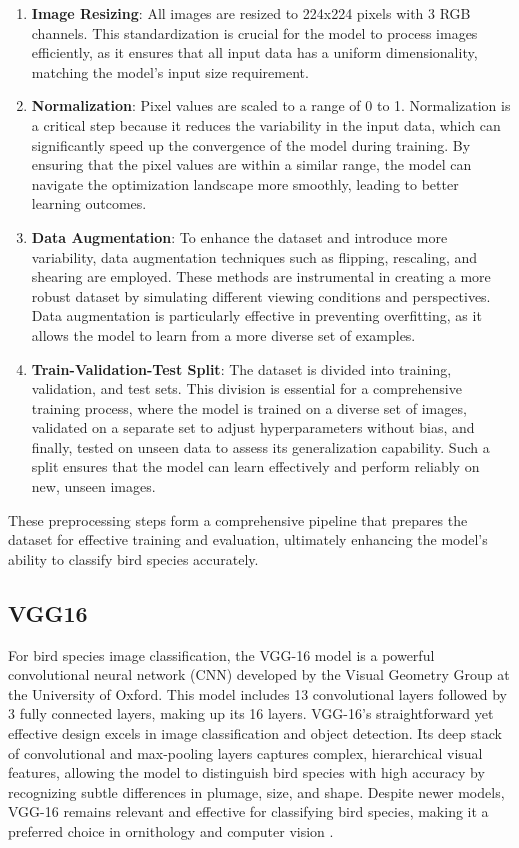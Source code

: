 \begin{enumerate}
    \item \textbf{Image Resizing}: All images are resized to 224x224 pixels with 3 RGB channels. This standardization is crucial for the model to process images efficiently, as it ensures that all input data has a uniform dimensionality, matching the model's input size requirement.

    \item \textbf{Normalization}: Pixel values are scaled to a range of 0 to 1. Normalization is a critical step because it reduces the variability in the input data, which can significantly speed up the convergence of the model during training. By ensuring that the pixel values are within a similar range, the model can navigate the optimization landscape more smoothly, leading to better learning outcomes.

    \item \textbf{Data Augmentation}: To enhance the dataset and introduce more variability, data augmentation techniques such as flipping, rescaling, and shearing are employed. These methods are instrumental in creating a more robust dataset by simulating different viewing conditions and perspectives. Data augmentation is particularly effective in preventing overfitting, as it allows the model to learn from a more diverse set of examples.

    \item \textbf{Train-Validation-Test Split}: The dataset is divided into training, validation, and test sets. This division is essential for a comprehensive training process, where the model is trained on a diverse set of images, validated on a separate set to adjust hyperparameters without bias, and finally, tested on unseen data to assess its generalization capability. Such a split ensures that the model can learn effectively and perform reliably on new, unseen images.
\end{enumerate}

These preprocessing steps form a comprehensive pipeline that prepares the
dataset for effective training and evaluation, ultimately enhancing the model's
ability to classify bird species accurately.

\subsection{VGG16}
For bird species image classification, the VGG-16 model is a powerful
convolutional neural network (CNN) developed by the Visual Geometry Group at
the University of Oxford. This model includes 13 convolutional layers followed
by 3 fully connected layers, making up its 16 layers. VGG-16's straightforward
yet effective design excels in image classification and object detection. Its
deep stack of convolutional and max-pooling layers captures complex,
hierarchical visual features, allowing the model to distinguish bird species
with high accuracy by recognizing subtle differences in plumage, size, and
shape. Despite newer models, VGG-16 remains relevant and effective for
classifying bird species, making it a preferred choice in ornithology and
computer vision \cite{bangar2022vgg}.

